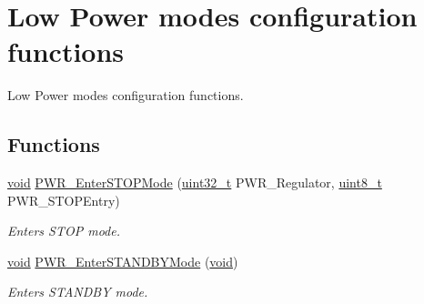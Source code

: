 \hypertarget{group___p_w_r___group6}{\section{Low Power modes configuration functions}
\label{group___p_w_r___group6}
}


Low Power modes configuration functions.  


\subsection*{Functions}
\begin{DoxyCompactItemize}
\item 
\hyperlink{group___n_a_m_e_ga18028b8badbf1ea7e704ccac3c488e82}{void} \hyperlink{group___p_w_r___group6_ga694676ac06a9baf50eae45adae0118ab}{P\-W\-R\-\_\-\-Enter\-S\-T\-O\-P\-Mode} (\hyperlink{stdint_8h_a435d1572bf3f880d55459d9805097f62}{uint32\-\_\-t} P\-W\-R\-\_\-\-Regulator, \hyperlink{stdint_8h_aba7bc1797add20fe3efdf37ced1182c5}{uint8\-\_\-t} P\-W\-R\-\_\-\-S\-T\-O\-P\-Entry)
\begin{DoxyCompactList}\small\item\em Enters S\-T\-O\-P mode. \end{DoxyCompactList}\item 
\hyperlink{group___n_a_m_e_ga18028b8badbf1ea7e704ccac3c488e82}{void} \hyperlink{group___p_w_r___group6_ga00ddae00a9c327b81b24d2597b0052f3}{P\-W\-R\-\_\-\-Enter\-S\-T\-A\-N\-D\-B\-Y\-Mode} (\hyperlink{group___n_a_m_e_ga18028b8badbf1ea7e704ccac3c488e82}{void})
\begin{DoxyCompactList}\small\item\em Enters S\-T\-A\-N\-D\-B\-Y mode. \end{DoxyCompactList}\end{DoxyCompactItemize}


